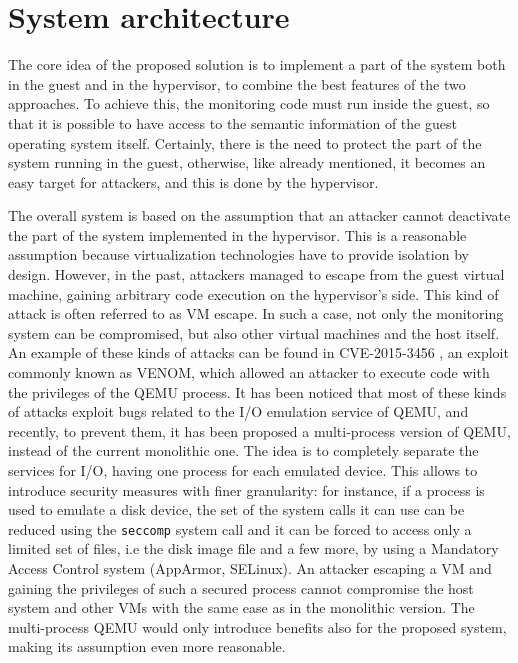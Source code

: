 \section{System architecture}
The core idea of the proposed solution is to implement a part of the system both in the guest and in the hypervisor, to combine the best features of the two approaches. To achieve this, the monitoring code must run inside the guest, so that it is possible to have access to the semantic information of the guest operating system itself. Certainly, there is the need to protect the part of the system running in the guest, otherwise, like already mentioned, it becomes an easy target for attackers, and this is done by the hypervisor.
\par
The overall system is based on the assumption that an attacker cannot deactivate the part of the system implemented in the hypervisor. This is a reasonable assumption because virtualization technologies have to provide isolation by design. However, in the past, attackers managed to escape from the guest virtual machine, gaining arbitrary code execution on the hypervisor's side. This kind of attack is often referred to as VM escape. In such a case, not only the monitoring system can be compromised, but also other virtual machines and the host itself. An example of these kinds of attacks can be found in CVE-2015-3456 \cite{venom-cve}, an exploit commonly known as VENOM, which allowed an attacker to execute code with the privileges of the QEMU process. It has been noticed that most of these kinds of attacks exploit bugs related to the I/O emulation service of QEMU, and recently, to prevent them, it has been proposed a multi-process version of QEMU, instead of the current monolithic one. The idea is to completely separate the services for I/O, having one process for each emulated device. This allows to introduce security measures with finer granularity: for instance, if a process is used to emulate a disk device, the set of the system calls it can use can be reduced using the \texttt{seccomp} system call and it can be forced to access only a limited set of files, i.e the disk image file and a few more, by using a Mandatory Access Control system (AppArmor, SELinux). An attacker escaping a VM and gaining the privileges of such a secured process cannot compromise the host system and other VMs with the same ease as in the monolithic version. The multi-process QEMU would only introduce benefits also for the proposed system, making its assumption even more reasonable. 
\par 
